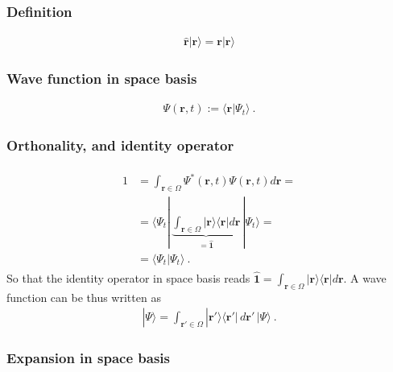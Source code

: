 \documentclass[letterpaper,10pt,english]{jupyterBook}
\begin{document}
\subsubsection*{Definition}
\begin{equation*}
\begin{split}\hat{\mathbf{r}} | \mathbf{r} \rangle = \mathbf{r} | \mathbf{r} \rangle\end{split}
\end{equation*}\subsubsection*{Wave function in space basis}
\begin{equation*}
\begin{split}\Psi(\mathbf{r}, t) := \langle \mathbf{r} | \Psi_t \rangle \ .\end{split}
\end{equation*}\subsubsection*{Orthonality, and identity operator}
\begin{equation*}
\begin{split}\begin{aligned}
  1
  & = \int_{\mathbf{r} \in \Omega} \Psi^*(\mathbf{r},t) \Psi(\mathbf{r},t) d \mathbf{r} = \\
  & = \langle \Psi_t | \, \underbrace{\int_{\mathbf{r} \in \Omega} | \mathbf{r} \rangle \langle \mathbf{r} | d \mathbf{r}}_{= \hat{\mathbf{1}} } \, | \Psi_t \rangle  = \\
  & = \langle \Psi_t | \Psi_t \rangle \ .
\end{aligned}\end{split}
\end{equation*}
\sphinxAtStartPar
So that the identity operator in space basis reads \(\hat{\mathbf{1}} = \int_{\mathbf{r} \in \Omega} | \mathbf{r} \rangle \langle \mathbf{r} | d \mathbf{r}\). A wave function can be thus written as
\begin{equation}\label{equation:ch/quantum-mechanics/wave-mechanics:eq:quantum:space-representation}
\begin{split}| \Psi \rangle = \int_{\mathbf{r}' \in \Omega} | \mathbf{r}' \rangle \langle \mathbf{r}' | \, d \mathbf{r}' \, | \Psi \rangle \ .\end{split}
\end{equation}\subsubsection*{Expansion in space basis}
\end{document}
